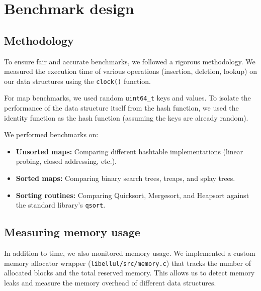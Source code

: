 \chapter{Benchmark design}\label{chap:map:benchmark}

\section{Methodology}

To ensure fair and accurate benchmarks, we followed a rigorous methodology. We measured the execution time of various operations (insertion, deletion, lookup) on our data structures using the \texttt{clock()} function.

For map benchmarks, we used random \texttt{uint64\_t} keys and values. To isolate the performance of the data structure itself from the hash function, we used the identity function as the hash function (assuming the keys are already random).

We performed benchmarks on:
\begin{itemize}
    \item \textbf{Unsorted maps:} Comparing different hashtable implementations (linear probing, closed addressing, etc.).
    \item \textbf{Sorted maps:} Comparing binary search trees, treaps, and splay trees.
    \item \textbf{Sorting routines:} Comparing Quicksort, Mergesort, and Heapsort against the standard library's \texttt{qsort}.
\end{itemize}

\section{Measuring memory usage}

In addition to time, we also monitored memory usage. We implemented a custom memory allocator wrapper (\texttt{libellul/src/memory.c}) that tracks the number of allocated blocks and the total reserved memory. This allows us to detect memory leaks and measure the memory overhead of different data structures.
